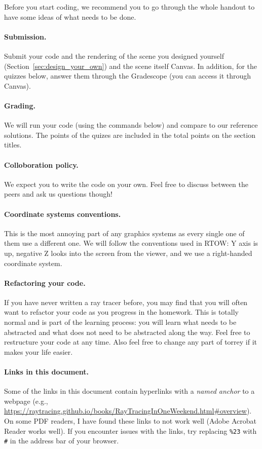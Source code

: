 Before you start coding, we recommend you to go through the whole handout to have some ideas of what needs to be done.

\paragraph{Submission.} Submit your code and the rendering of the scene you designed yourself (Section~\ref{sec:design_your_own}) and the scene itself Canvas. In addition, for the quizzes below, answer them through the Gradescope (you can access it through Canvas).

\paragraph{Grading.} We will run your code (using the commands below) and compare to our reference solutions. The points of the quizes are included in the total points on the section titles.

\paragraph{Colloboration policy.} We expect you to write the code on your own. Feel free to discuss between the peers and ask us questions though!

\paragraph{Coordinate systems conventions.} This is the most annoying part of any graphics systems as every single one of them use a different one. We will follow the conventions used in RTOW: Y axis is up, negative Z looks into the screen from the viewer, and we use a right-handed coordinate system.

\paragraph{Refactoring your code.} If you have never written a ray tracer before, you may find that you will often want to refactor your code as you progress in the homework. This is totally normal and is part of the learning process: you will learn what needs to be abstracted and what does not need to be abstracted along the way. Feel free to restructure your code at any time. Also feel free to change any part of torrey if it makes your life easier.

\paragraph{Links in this document.} Some of the links in this document contain hyperlinks with a \emph{named anchor} to a webpage (e.g., \url{https://raytracing.github.io/books/RayTracingInOneWeekend.html\#overview}). On some PDF readers, I have found these links to not work well (Adobe Acrobat Reader works well). If you encounter issues with the links, try replacing \lstinline{%23} with \lstinline{#} in the address bar of your browser.

